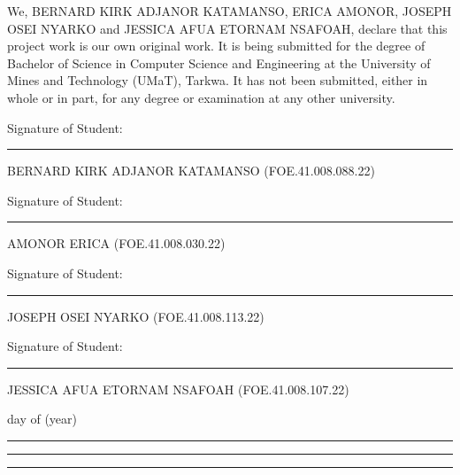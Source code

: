 
\vspace{-20pt}
\begin{declaration}
	\addchaptertocentry{\authorshipname}

	We, BERNARD KIRK ADJANOR KATAMANSO, ERICA AMONOR, JOSEPH OSEI NYARKO and JESSICA AFUA ETORNAM NSAFOAH, declare that this project work is our own original work. It is being submitted for the degree of Bachelor of Science in Computer Science and Engineering at the University of Mines and Technology (UMaT), Tarkwa. It has not been submitted, either in whole or in part, for any degree or examination at any other university.

	\vspace{20pt}

	Signature of Student: \hspace{1.5cm} \rule{9cm}{0.5pt}

	BERNARD KIRK ADJANOR KATAMANSO (FOE.41.008.088.22)

	\vspace{10pt}

	Signature of Student: \hspace{1.5cm} \rule{9cm}{0.5pt}

	AMONOR ERICA (FOE.41.008.030.22)

	\vspace{10pt}

	Signature of Student: \hspace{1.5cm} \rule{9cm}{0.5pt}

	JOSEPH OSEI NYARKO (FOE.41.008.113.22)

	\vspace{10pt}

	Signature of Student: \hspace{1.5cm} \rule{9cm}{0.5pt}

	JESSICA AFUA ETORNAM NSAFOAH (FOE.41.008.107.22)

	\vspace{1.5cm}

	\hspace{5.3em} day of\vspace{-10pt} \hspace{9em} (year)\vspace{-5pt}

	\noindent \rule[0.5em]{5em}{0.5pt} \hspace{3.5em} \rule[0.5em]{8em}{0.5pt} \hspace{3.2em} \rule[0.5em]{5em}{0.5pt}
\end{declaration}
